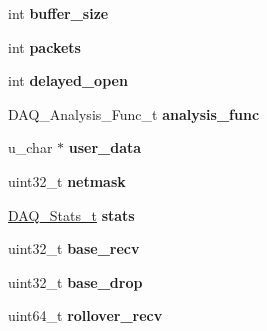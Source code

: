 \begin{DoxyCompactItemize}
\item 
\hypertarget{struct__pcap__context_a3a24ec19befdcd5f7a99cbc949449f29}{
int {\bfseries buffer\_\-size}}
\label{struct__pcap__context_a3a24ec19befdcd5f7a99cbc949449f29}

\item 
\hypertarget{struct__pcap__context_a394723bba1053b55fc881f0706e48bbc}{
int {\bfseries packets}}
\label{struct__pcap__context_a394723bba1053b55fc881f0706e48bbc}

\item 
\hypertarget{struct__pcap__context_a1adc17dd534e55d0c371ec375fca830e}{
int {\bfseries delayed\_\-open}}
\label{struct__pcap__context_a1adc17dd534e55d0c371ec375fca830e}

\item 
\hypertarget{struct__pcap__context_a424fbc5ed04213c504a72e6e179f7d54}{
DAQ\_\-Analysis\_\-Func\_\-t {\bfseries analysis\_\-func}}
\label{struct__pcap__context_a424fbc5ed04213c504a72e6e179f7d54}

\item 
\hypertarget{struct__pcap__context_addaa557f209e0b36f542ccc30d88c49f}{
u\_\-char $\ast$ {\bfseries user\_\-data}}
\label{struct__pcap__context_addaa557f209e0b36f542ccc30d88c49f}

\item 
\hypertarget{struct__pcap__context_acfe3e9763cfc83fa290cb2fb920a2ddc}{
uint32\_\-t {\bfseries netmask}}
\label{struct__pcap__context_acfe3e9763cfc83fa290cb2fb920a2ddc}

\item 
\hypertarget{struct__pcap__context_ac001f1ce3488ea557812b5cd2d2dfb22}{
\hyperlink{struct__daq__stats}{DAQ\_\-Stats\_\-t} {\bfseries stats}}
\label{struct__pcap__context_ac001f1ce3488ea557812b5cd2d2dfb22}

\item 
\hypertarget{struct__pcap__context_a41f73b7b52306acb6f0a51dec48185e4}{
uint32\_\-t {\bfseries base\_\-recv}}
\label{struct__pcap__context_a41f73b7b52306acb6f0a51dec48185e4}

\item 
\hypertarget{struct__pcap__context_aef692dbfa5456bacacd2bfd1d3aff3b4}{
uint32\_\-t {\bfseries base\_\-drop}}
\label{struct__pcap__context_aef692dbfa5456bacacd2bfd1d3aff3b4}

\item 
\hypertarget{struct__pcap__context_aad9213f3e751971d850e511f73eaabb8}{
uint64\_\-t {\bfseries rollover\_\-recv}}
\label{struct__pcap__context_aad9213f3e751971d850e511f73eaabb8}


\end{DoxyCompactItemize}
